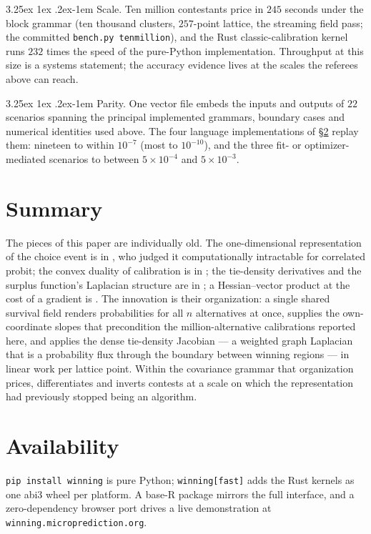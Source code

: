 \documentclass[11pt]{article}
\makeatletter
\renewcommand\paragraph{\@startsection{paragraph}{4}{\z@}%
  {3.25ex \@plus1ex \@minus.2ex}{-1em}%
  {\normalfont\normalsize\itshape}}
\makeatother
\begin{document}
\paragraph{Scale.} Ten million contestants price in $245$ seconds under the
block grammar (ten thousand clusters, $257$-point lattice, the streaming
field pass; the committed \texttt{bench.py tenmillion}), and the Rust
classic-calibration kernel runs $232$ times the speed of the pure-Python
implementation. Throughput at this size is a systems statement; the accuracy
evidence lives at the scales the referees above can reach.

\paragraph{Parity.} One vector file embeds the inputs and outputs of
$22$ scenarios spanning the principal implemented grammars, boundary
cases and numerical identities used above. The four language
implementations of \S\ref{sec:avail} replay them: nineteen to within
$10^{-7}$ (most to $10^{-10}$), and the three fit- or optimizer-mediated
scenarios to between $5\times10^{-4}$ and $5\times10^{-3}$.

\section{Summary}\label{sec:summary}

The pieces of this paper are individually old. The one-dimensional
representation of the choice event is in \citet{domencich1975}, who
judged it computationally intractable for correlated probit; the convex
duality of calibration is in \citet{li2018}; the tie-density
derivatives and the surplus function's Laplacian structure are in
\citet{muller2022}; a Hessian--vector product at the cost of a gradient
is \citet{pearlmutter1994}. The innovation is their organization: a
single shared survival field renders probabilities for all $n$
alternatives at once, supplies the own-coordinate slopes that
precondition the million-alternative calibrations reported here, and
applies the dense tie-density Jacobian --- a weighted graph Laplacian
that is a probability flux through the boundary between winning regions
--- in linear work per lattice point. Within the covariance grammar that
organization prices, differentiates and inverts contests at a scale on
which the representation had previously stopped being an algorithm.

\section{Availability}\label{sec:avail}
\texttt{pip install winning} is pure Python; \texttt{winning[fast]} adds the
Rust kernels as one abi3 wheel per platform. A base-R package mirrors the full
interface, and a zero-dependency browser port drives a live demonstration at
\texttt{winning.microprediction.org}.
\end{document}
